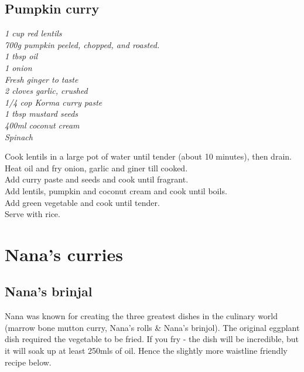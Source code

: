 \documentclass{tufte-book}
\begin{document}

\section{Pumpkin curry}
\emph{1 cup red lentils
\\700g pumpkin peeled, chopped, and roasted.
\\1 tbsp oil
\\1 onion
\\Fresh ginger to taste
\\2 cloves garlic, crushed
\\1/4 cop Korma curry paste
\\1 tbsp mustard seeds
\\400ml coconut cream
\\Spinach{}}

\smallskip
Cook lentils in a large pot of water until tender (about 10 minutes), then drain.
\\Heat oil and fry onion, garlic and giner till cooked. 
\\Add curry paste and seeds and cook until fragrant.
\\Add lentils, pumpkin and coconut cream and cook until boils.
\\Add green vegetable and cook until tender.
\\Serve with rice.

\chapter{Nana's curries}

\section{Nana's brinjal}

Nana was known for creating the three greatest dishes in the culinary world (marrow bone mutton curry, Nana's rolls \& Nana's brinjol). The original eggplant dish required the vegetable to be fried. If you fry - the dish will be incredible, but it will soak up at least 250mls of oil. Hence the slightly more waistline friendly recipe below.
\end{document}
